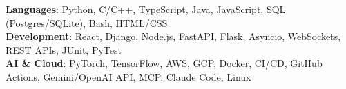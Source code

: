 \begin{itemize}[leftmargin=0.15in, label={}]
    \small{\item{
     \textbf{Languages}{: Python, C/C++, TypeScript, Java, JavaScript, SQL (Postgres/SQLite), Bash, HTML/CSS} \\
     \textbf{Development}{: React, Django, Node.js, FastAPI, Flask, Asyncio, WebSockets, REST APIs, JUnit, PyTest} \\
     \textbf{AI \& Cloud}{: PyTorch, TensorFlow, AWS, GCP, Docker, CI/CD, GitHub Actions, Gemini/OpenAI API, MCP, Claude Code, Linux}
    }}
\end{itemize}
